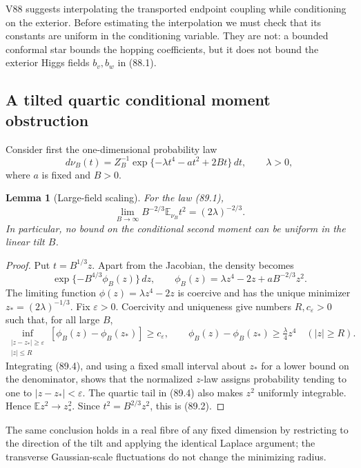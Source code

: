 \documentclass[11pt]{article}
\newtheorem{lemma}[theorem]{Lemma}
\theoremstyle{remark}
\begin{document}
V88 suggests interpolating the transported endpoint coupling while
conditioning on the exterior.  Before estimating the interpolation we
must check that its constants are uniform in the conditioning variable.
They are not: a bounded conformal star bounds the hopping coefficients,
but it does not bound the exterior Higgs fields \(b_v,b_w\) in (88.1).

\subsection{A tilted quartic conditional moment obstruction}

Consider first the one-dimensional probability law
\[
 d\nu_B(t)=Z_B^{-1}
 \exp\{-\lambda t^4-at^2+2Bt\}\,dt,
 \qquad \lambda>0,                                  \tag{89.1}
\]
where \(a\) is fixed and \(B>0\).

\begin{lemma}[Large-field scaling]
\label{lem:v17v89-large-field}
For the law (89.1),
\[
 \boxed{
 \lim_{B\to\infty}B^{-2/3}\mathbb E_{\nu_B}t^2
 =(2\lambda)^{-2/3}.}                               \tag{89.2}
\]
In particular, no bound on the conditional second moment can be
uniform in the linear tilt \(B\).
\end{lemma}

\begin{proof}
Put \(t=B^{1/3}z\).  Apart from the Jacobian, the density becomes
\[
 \exp\{-B^{4/3}\phi_B(z)\}\,dz,
 \qquad
 \phi_B(z)=\lambda z^4-2z+aB^{-2/3}z^2.             \tag{89.3}
\]
The limiting function \(\phi(z)=\lambda z^4-2z\) is coercive and has
the unique minimizer
\(z_*=(2\lambda)^{-1/3}\).  Fix \(\varepsilon>0\).  Coercivity and
uniqueness give numbers \(R,c_\varepsilon>0\) such that, for all large
\(B\),
\[
 \inf_{\substack{|z-z_*|\geq\varepsilon\\|z|\leq R}}
 [\phi_B(z)-\phi_B(z_*)]\geq c_\varepsilon,
 \qquad
 \phi_B(z)-\phi_B(z_*)\geq\tfrac{\lambda}{4}z^4
 \quad(|z|\geq R).                                  \tag{89.4}
\]
Integrating (89.4), and using a fixed small interval about \(z_*\) for
a lower bound on the denominator, shows that the normalized
\(z\)-law assigns probability tending to one to
\(|z-z_*|<\varepsilon\).  The quartic tail in (89.4) also makes
\(z^2\) uniformly integrable.  Hence
\(\mathbb E z^2\to z_*^2\).  Since \(t^2=B^{2/3}z^2\), this is (89.2).
\end{proof}

The same conclusion holds in a real fibre of any fixed dimension by
restricting to the direction of the tilt and applying the identical
Laplace argument; the transverse Gaussian-scale fluctuations do not
change the minimizing radius.
\end{document}
